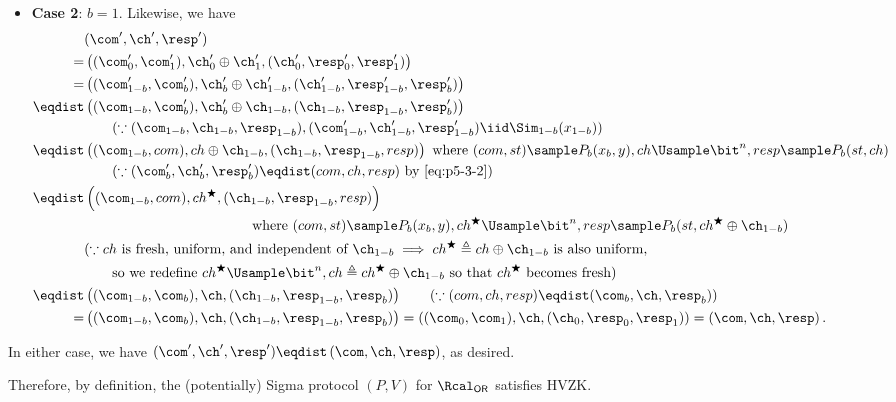 \begin{answer}
\begin{itemize}
        \item  \textbf{Case 2}: $b=1$. Likewise, we have
        \begin{align*}
            &(\com', \ch', \resp')\\
            =&  \left( (\com_0', \com_1'), \ch_0'\oplus \ch_1', (\ch_0', \resp_0', \resp_1') \right)\\
            =&  \left( (\com_{1-b}', \com_b'), \ch_b'\oplus \ch_{1-b}', (\ch_{1-b}', \resp_{1-b}', \resp_{b}') \right)\\
            \eqdist&  \left( (\com_{1-b}, \com_b'), \ch_b'\oplus \ch_{1-b}, (\ch_{1-b}, \resp_{1-b}, \resp_{b}') \right) \\
            &\qquad (\because (\com_{1-b}, \ch_{1-b}, \resp_{1-b}),(\com_{1-b}', \ch_{1-b}', \resp_{1-b}')\iid \Sim_{1-b}(x_{1-b}))\\
            \eqdist& \left( ( \com_{1-b}, com), ch\oplus \ch_{1-b}, (\ch_{1-b},  \resp_{1-b}, resp) \right) \textrm{ where } (com, st)\sample P_b(x_b, y), ch\Usample\bit^n, resp\sample P_b(st, ch) \\
            &\qquad (\because  (\com_b', \ch_b', \resp_b') \eqdist(com, ch , resp) \textrm{ by \eqref{eq:p5-3-2}})\\
            \eqdist& \left( ( \com_{1-b}, com), {ch}^\bigstar, (\ch_{1-b},  \resp_{1-b}, resp) \right)\\
            &\qquad\qquad\qquad\qquad\qquad\qquad \textrm{where }(com, st)\sample P_b(x_b, y), {ch}^\bigstar\Usample\bit^n, resp\sample P_b(st, {ch}^\bigstar\oplus \ch_{1-b}) \\
            & (\because  ch \textrm{ is fresh, uniform, and independent of } \ch_{1-b} \implies {ch}^\bigstar\triangleq ch\oplus \ch_{1-b} \textrm{ is also uniform,}\\
            &\qquad \textrm{so we redefine }  {ch}^\bigstar \Usample\bit^n, ch\triangleq {ch}^\bigstar\oplus \ch_{1-b} \textrm{ so that } {ch}^\bigstar \textrm{ becomes fresh})\\
            \eqdist& \left( (\com_{1-b}, \com_b), \ch, (\ch_{1-b},  \resp_{1-b}, \resp_b) \right) \qquad (\because (com, ch, resp)\eqdist (\com_b, \ch, \resp_b))\\
            =& \left( (\com_{1-b}, \com_b), \ch, (\ch_{1-b},  \resp_{1-b}, \resp_b) \right)
            = \left( (\com_0, \com_{1}), \ch, (\ch_0,  \resp_0, \resp_{1}) \right)
            = \left(\com, \ch, \resp\right).
        \end{align*} 
    \end{itemize}
    In either case, we have $(\com', \ch', \resp') \eqdist \left(\com, \ch, \resp\right)$, as desired.

    Therefore, by definition, the (potentially) Sigma protocol $(P, V)$ for $\Rcal_\mathsf{OR}$ satisfies HVZK.
\end{answer}